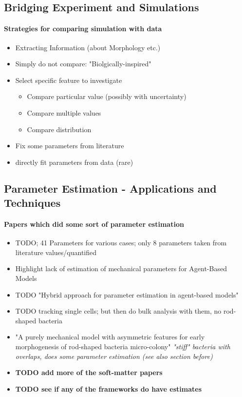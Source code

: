 \subsection{Bridging Experiment and Simulations}
\paragraph{Strategies for comparing simulation with data}
\begin{itemize}
    \item Extracting Information (about Morphology etc.)
    \item Simply do not compare: "Biolgically-inspired"
    \item Select specific feature to investigate
        \begin{itemize}
            \item Compare particular value (possibly with uncertainty)
            \item Compare multiple values
            \item Compare distribution
        \end{itemize}
    \item Fix some parameters from literature
    \item directly fit parameters from data (rare)
\end{itemize}

\subsection{Parameter Estimation - Applications and Techniques}

\paragraph{Papers which did some sort of parameter estimation}
\begin{itemize}
    \item \cite{Storck2014} TODO; 41 Parameters for various cases; only 8 parameters taken from
        literature values/quantified
    \item Highlight lack of estimation of mechanical parameters for Agent-Based Models
    \item \cite{Gallaher2017} TODO "Hybrid approach for parameter estimation in agent-based models"
    \item \cite{Nguyen2024} TODO tracking single cells; but then do bulk analysis with them, no
        rod-shaped bacteria
    \item \cite{Doumic2020} "A purely mechanical model with asymmetric features for early
        morphogenesis of rod-shaped bacteria micro-colony" \textit{"stiff" bacteria with
        overlaps, does some parameter estimation (see also section before)}
    \item \textbf{TODO add more of the soft-matter papers}
    \item \textbf{TODO see if any of the frameworks do have estimates}
\end{itemize}

